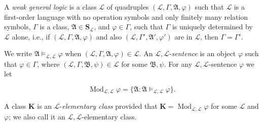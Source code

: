 A \emph{weak general logic} is a class $\mathscr{L}$ of quadruples $(\mathcal{L}, \Gamma, \mathfrak{A}, \varphi)$ such that $\mathcal{L}$ is a first-order language with no operation symbols and only finitely many relation symbols, $\Gamma$ is a class, $\mathfrak{A} \in \mathbf{S}_{\mathcal{L}}$, and $\varphi \in \Gamma$, such that $\Gamma$ is uniquely determined by $\mathcal{L}$ alone, i.e., if $(\mathcal{L}, \Gamma, \mathfrak{A}, \varphi)$ and also $(\mathcal{L}, \Gamma', \mathfrak{A}', \varphi')$ are in $\mathscr{L}$, then $\Gamma = \Gamma'$.

We write $\mathfrak{A} \models_{\mathscr{L}, \mathcal{L}} \varphi$ when $(\mathcal{L}, \Gamma, \mathfrak{A}, \varphi) \in \mathscr{L}$. An $\mathscr{L}, \mathcal{L}$-\emph{sentence} is an object $\varphi$ such that $\varphi \in \Gamma$, where $(\mathcal{L}, \Gamma, \mathfrak{B}, \psi) \in \mathscr{L}$ for some $\mathfrak{B}, \psi$. For any $\mathscr{L}, \mathcal{L}$-sentence $\varphi$ we let

$$\operatorname{Mod}_{\mathscr{L}, \mathcal{L}} \varphi = \{ \mathfrak{A} : \mathfrak{A} \models_{\mathscr{L}, \mathcal{L}} \varphi \}.$$

A class $\mathbf{K}$ is an $\mathscr{L}$-\emph{elementary class} provided that $\mathbf{K} = \operatorname{Mod}_{\mathscr{L}, \mathcal{L}} \varphi$ for some $\mathcal{L}$ and $\varphi$; we also call it an $\mathscr{L}, \mathcal{L}$-elementary class.
